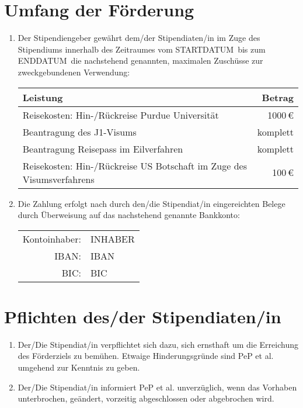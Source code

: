 \documentclass[
  paper=a4,
  fontsize=12pt,
  DIV=16,
  parskip=full,
  headinclude=true,
]{scrartcl}
\newcommand\stipstart{STARTDATUM} %
\newcommand\stipende{ENDDATUM}    %
\newcommand\stipkontoinhaber{INHABER}    %
\newcommand\stipbic{BIC}          %
\newcommand\stipiban{IBAN}
\begin{document}
\section{Umfang der Förderung}

\begin{enumerate}[\qquad(1)]
  \item Der Stipendiengeber gewährt dem/der Stipendiaten/in im Zuge des
    Stipendiums innerhalb des Zeitraumes vom \stipstart\ bis zum \stipende\
    die nachstehend genannten, maximalen Zuschüsse zur zweckgebundenen Verwendung:

    \begin{tabular}{l r}
      \toprule
      Leistung & Betrag \\
      \midrule
      Reisekosten: Hin-/Rückreise Purdue Universität & \num{1000}\,€ \\
      Beantragung des J1-Visums & komplett \\
      Beantragung Reisepass im Eilverfahren & komplett \\
      Reisekosten: Hin-/Rückreise US Botschaft im Zuge des Visumsverfahrens &
        \num{100}\,€ \\
      \bottomrule
    \end{tabular}
  \item Die Zahlung erfolgt nach durch den/die Stipendiat/in eingereichten
    Belege durch Überweisung auf das nachstehend genannte Bankkonto:

    \begin{tabular}{rl}
      Kontoinhaber: & \stipkontoinhaber \\
      IBAN: & \stipiban \\
      BIC: & \stipbic \\
    \end{tabular}
\end{enumerate}

\section{Pflichten des/der Stipendiaten/in}

\begin{enumerate}[\qquad(1)]
  \item Der/Die Stipendiat/in verpflichtet sich dazu, sich ernsthaft um die
    Erreichung des Förderziels zu bemühen. Etwaige Hinderungsgründe sind
    PeP et al. umgehend zur Kenntnis zu geben.
  \item Der/Die Stipendiat/in informiert PeP et al. unverzüglich, wenn das
    Vorhaben unterbrochen, geändert, vorzeitig abgeschlossen oder
    abgebrochen wird.
\end{enumerate}
\end{document}
